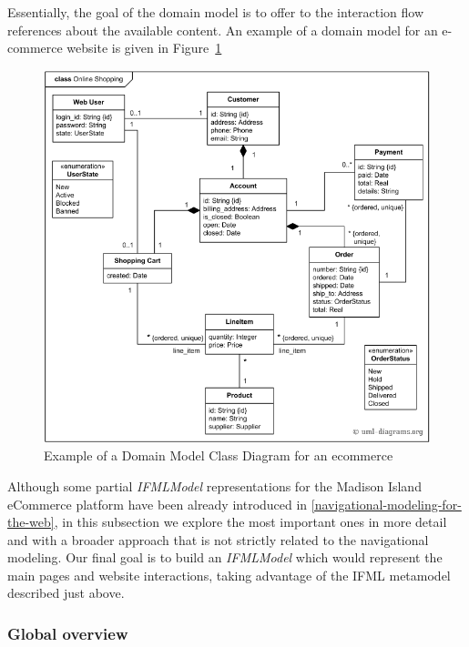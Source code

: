 Essentially, the goal of the domain model is to offer to the interaction flow references about the available content. An example of a domain model for an e-commerce website is given in Figure~\ref{fig:domain-model-uml-ecommerce}   

\vspace{0.5cm}
\begin{figure}[H]
  \centering
    \includegraphics[width=12cm]{images/diagrams/domain-model-uml-ecommerce.png}
  \caption{Example of a Domain Model Class Diagram for an ecommerce}
  \label{fig:domain-model-uml-ecommerce}
\end{figure}
\vspace{0.5cm}

Although some partial \textit{IFMLModel} representations for the Madison Island eCommerce platform have been already introduced in \ref{navigational-modeling-for-the-web}, in this subsection we explore the most important ones in more detail and with a broader approach that is not strictly related to the navigational modeling. Our final goal is to build an \textit{IFMLModel} which would represent the main pages and website interactions, taking advantage of the IFML metamodel described just above.

\subsubsection{Global overview}

